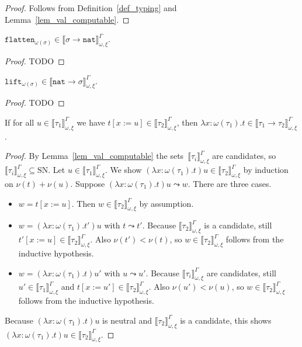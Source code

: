 \documentclass[runningheads,a4paper]{llncs}
\newcommand{\subst}[2]{#1:=#2}
\newcommand{\nat}{\mathtt{nat}}
\newcommand{\flatten}{\mathtt{flatten}}
\newcommand{\lift}{\mathtt{lift}}
\newcommand{\SN}{\mathrm{SN}}
\newcommand{\val}[3]{\ensuremath{\llbracket#1\rrbracket_{#2}^{#3}}}
\begin{document}
\begin{proof}
  Follows from Definition~\ref{def_typing} and
  Lemma~\ref{lem_val_computable}.
\end{proof}

\begin{lemma}
  $\flatten_{\omega(\sigma)} \in
  \val{\sigma\to\nat}{\omega,\xi}{\Gamma}$.
\end{lemma}

\begin{proof}
  TODO
\end{proof}

\begin{lemma}
  $\lift_{\omega(\sigma)} \in
  \val{\nat\to\sigma}{\omega,\xi}{\Gamma}$.
\end{lemma}

\begin{proof}
  TODO
\end{proof}

\begin{lemma}
  If for all $u \in \val{\tau_1}{\omega,\xi}{\Gamma}$ we have
  $t[\subst{x}{u}] \in \val{\tau_2}{\omega,\xi}{\Gamma}$, then
  $\lambda x : \omega(\tau_1) . t \in
  \val{\tau_1\to\tau_2}{\omega,\xi}{\Gamma}$.
\end{lemma}

\begin{proof}
  By Lemma~\ref{lem_val_computable} the
  sets~$\val{\tau_i}{\omega,\xi}{\Gamma}$ are candidates, so
  $\val{\tau_i}{\omega,\xi}{\Gamma} \subseteq \SN$. Let
  $u \in \val{\tau_1}{\omega,\xi}{\Gamma}$. We show
  $(\lambda x : \omega(\tau_1) . t) u \in
  \val{\tau_2}{\omega,\xi}{\Gamma}$ by induction on $\nu(t) +
  \nu(u)$. Suppose $(\lambda x : \omega(\tau_1) . t) u \leadsto
  w$. There are three cases.
  \begin{itemize}
  \item $w = t[\subst{x}{u}]$. Then
    $w \in \val{\tau_2}{\omega,\xi}{\Gamma}$ by assumption.
  \item $w = (\lambda x : \omega(\tau_1) . t') u$ with
    $t \leadsto t'$. Because $\val{\tau_2}{\omega,\xi}{\Gamma}$ is a
    candidate, still
    $t'[\subst{x}{u}] \in \val{\tau_2}{\omega,\xi}{\Gamma}$. Also
    $\nu(t') < \nu(t)$, so $w \in \val{\tau_2}{\omega,\xi}{\Gamma}$
    follows from the inductive hypothesis.
  \item $w = (\lambda x : \omega(\tau_1) . t) u'$ with
    $u \leadsto u'$. Because $\val{\tau_i}{\omega,\xi}{\Gamma}$ are
    candidates, still $u' \in \val{\tau_1}{\omega,\xi}{\Gamma}$ and
    $t[\subst{x}{u'}] \in \val{\tau_2}{\omega,\xi}{\Gamma}$. Also
    $\nu(u') < \nu(u)$, so $w \in \val{\tau_2}{\omega,\xi}{\Gamma}$
    follows from the inductive hypothesis.
  \end{itemize}
  Because $(\lambda x : \omega(\tau_1) . t) u$ is neutral and
  $\val{\tau_2}{\omega,\xi}{\Gamma}$ is a candidate, this shows
  $(\lambda x : \omega(\tau_1) . t) u \in
  \val{\tau_2}{\omega,\xi}{\Gamma}$.
\end{proof}
\end{document}
